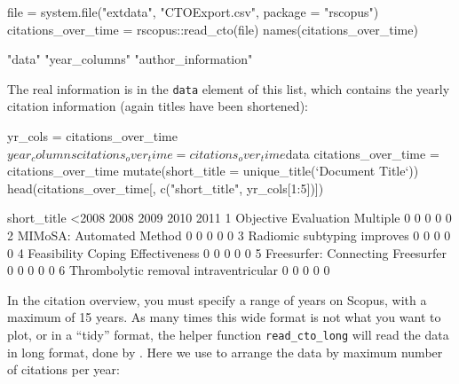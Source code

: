 \begin{Schunk}
\begin{Sinput}
file = system.file("extdata", "CTOExport.csv", package = "rscopus")
citations_over_time = rscopus::read_cto(file)
names(citations_over_time)
\end{Sinput}
\begin{Soutput}
[1] "data"               "year_columns"       "author_information"
\end{Soutput}
\end{Schunk}

The real information is in the \texttt{data} element of this list, which
contains the yearly citation information (again titles have been
shortened):

\begin{Schunk}
\begin{Sinput}
yr_cols = citations_over_time$year_columns
citations_over_time = citations_over_time$data
citations_over_time = citations_over_time %
  mutate(short_title = unique_title(`Document Title`))
head(citations_over_time[, c("short_title", yr_cols[1:5])])
\end{Sinput}
\begin{Soutput}
                            short_title <2008 2008 2009 2010 2011
1         Objective Evaluation Multiple     0    0    0    0    0
2              MIMoSA: Automated Method     0    0    0    0    0
3           Radiomic subtyping improves     0    0    0    0    0
4      Feasibility Coping Effectiveness     0    0    0    0    0
5     Freesurfer: Connecting Freesurfer     0    0    0    0    0
6 Thrombolytic removal intraventricular     0    0    0    0    0
\end{Soutput}
\end{Schunk}

In the citation overview, you must specify a range of years on Scopus,
with a maximum of 15 years. As many times this wide format is not what
you want to plot, or in a ``tidy'' format, the  helper
function \texttt{read\_cto\_long} will read the data in long format,
done by  \citep{tidyr}. Here we use  to
arrange the data by maximum number of citations per year:

